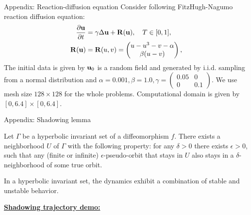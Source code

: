 \documentclass[NUS-Kajima workshop]{beamer}
\begin{document}
\begin{frame}{Appendix: Reaction-diffusion equation}
	Consider following FitzHugh-Nagumo reaction diffusion equation:
	\begin{equation}
    \begin{aligned}
        	\frac{\partial \mathbf{u}}{\partial t} & = \gamma \Delta \mathbf{u} + \mathbf{R}(\mathbf{u}), \quad T \in [0, 1], 	\\
		\mathbf{R}(\mathbf{u}) & = \mathbf{R}(u, v) = \begin{pmatrix}
			u - u^3 - v - \alpha	\\
			\beta(u - v)
		\end{pmatrix},
    \end{aligned}
	\end{equation}
	The initial data is given by $\mathbf{u}_0$ is a random field and generated by i.i.d. sampling from a normal distribution and $\alpha = 0.001, \beta=1.0, \gamma = \begin{pmatrix}
		0.05 & 0	\\
		0 & 0.1
	\end{pmatrix}$. We use mesh size $128 \times 128$ for the whole problems. Computational domain is given by $[0, 6.4]\times[0, 6.4]$.
\end{frame}

\begin{frame}{Appendix: Shadowing lemma}
	\begin{theorem}
		Let $\Gamma$ be a hyperbolic invariant set of a diffeomorphism $f$. There exists a 
		neighborhood $U$ of $\Gamma$ with the following property: for any $\delta > 0$ there 
		exists $\epsilon > 0$, such that any (finite or infinite) $\epsilon$-pseudo-orbit that 
		stays in $U$ also stays in a $\delta$-neighborhood of some true orbit\footnotemark.
	\end{theorem}
	In a hyperbolic invariant set, the dynamics exhibit a combination of stable and unstable behavior.

	\href{https://www.youtube.com/watch?v=07jkQ1ox7vI&t=290s}{\textbf{Shadowing trajectory demo:}}
\end{frame}
\end{document}
